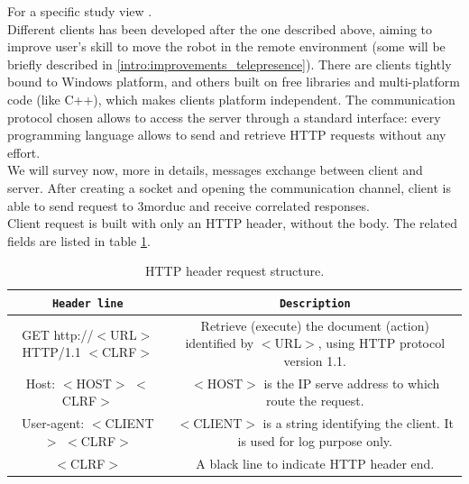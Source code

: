 For a specific study view \cite{morduc:neri}.
\\
Different clients has been developed after the one described above, aiming to
improve user's skill to move the robot in the remote environment
(some will be briefly described in \ref{intro:improvements_telepresence}). There are
clients tightly bound to Windows platform, and others
built on free libraries and multi-platform code (like C++), which makes clients
platform independent. The communication protocol chosen allows to
access the server through a standard interface: every programming language
allows to send and retrieve HTTP requests without any effort.
\\
We will survey now, more in details, messages exchange between client and server.
After creating a socket and opening the communication channel, client is able
to send request to 3morduc and receive correlated responses.
\\
Client request is built with only an HTTP header, without the body. The related
fields are listed in table \ref{table:header_request}.

\begin{table}[h]
  \centering  
  \begin{tabular}{| c | c |}

    \hline
    \texttt{\bf Header line} &
    \texttt{\bf Description} \\ %

    \hline
    \parbox[t]{6.5cm}{\raggedright \small GET http://$<$URL$>$ HTTP/1.1 $<$CLRF$>$} &
    \parbox[t]{6cm}{\raggedright \small
      Retrieve (execute) the document (action) identified by $<$URL$>$,
      using HTTP protocol version 1.1.} \\  [1ex]

    \hline
    \parbox[t]{6.5cm}{\raggedright \small Host: $<$HOST$>$ $<$CLRF$>$} &
    \parbox[t]{6cm}{\raggedright \small
      $<$HOST$>$ is the IP serve address to which route the request.} \\ [1ex]
    
    \hline
    \parbox[t]{6.5cm}{\raggedright \small User-agent:  $<$CLIENT$>$ $<$CLRF$>$} &
    \parbox[t]{6cm}{\raggedright \small
      $<$CLIENT$>$ is a string identifying the client. It is used for log
      purpose only.} \\  [1ex]

    \hline
    \parbox[t]{6.5cm}{\raggedright \small $<$CLRF$>$} &
    \parbox[t]{6cm}{\raggedright \small
      A black line to indicate HTTP header end.} \\ [1ex]

    \hline

  \end{tabular}
  \caption{HTTP header request structure.}
  \label{table:header_request}
\end{table}

